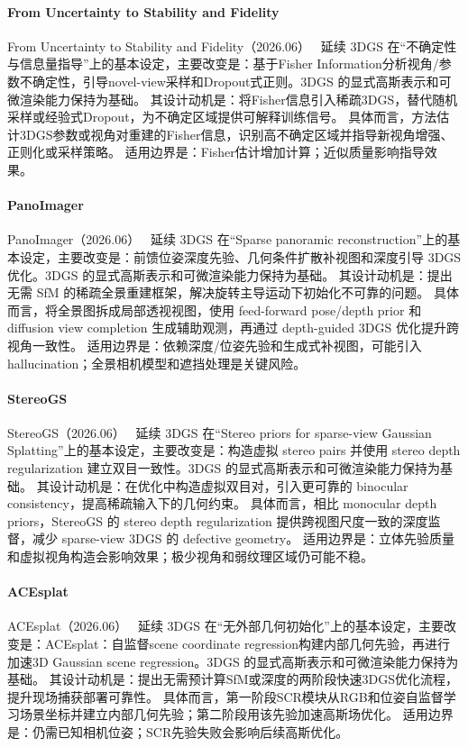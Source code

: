 \paragraph{From Uncertainty to Stability and Fidelity}
From Uncertainty to Stability and Fidelity（2026.06）~\cite{2606_20842} 延续 3DGS 在“不确定性与信息量指导”上的基本设定，主要改变是：基于Fisher Information分析视角/参数不确定性，引导novel-view采样和Dropout式正则。3DGS 的显式高斯表示和可微渲染能力保持为基础。
其设计动机是：将Fisher信息引入稀疏3DGS，替代随机采样或经验式Dropout，为不确定区域提供可解释训练信号。
具体而言，方法估计3DGS参数或视角对重建的Fisher信息，识别高不确定区域并指导新视角增强、正则化或采样策略。
适用边界是：Fisher估计增加计算；近似质量影响指导效果。

\paragraph{PanoImager}
PanoImager（2026.06）~\cite{2606_27071} 延续 3DGS 在“Sparse panoramic reconstruction”上的基本设定，主要改变是：前馈位姿深度先验、几何条件扩散补视图和深度引导 3DGS 优化。3DGS 的显式高斯表示和可微渲染能力保持为基础。
其设计动机是：提出无需 SfM 的稀疏全景重建框架，解决旋转主导运动下初始化不可靠的问题。
具体而言，将全景图拆成局部透视视图，使用 feed-forward pose/depth prior 和 diffusion view completion 生成辅助观测，再通过 depth-guided 3DGS 优化提升跨视角一致性。
适用边界是：依赖深度/位姿先验和生成式补视图，可能引入 hallucination；全景相机模型和遮挡处理是关键风险。

\paragraph{StereoGS}
StereoGS（2026.06）~\cite{2606_30545} 延续 3DGS 在“Stereo priors for sparse-view Gaussian Splatting”上的基本设定，主要改变是：构造虚拟 stereo pairs 并使用 stereo depth regularization 建立双目一致性。3DGS 的显式高斯表示和可微渲染能力保持为基础。
其设计动机是：在优化中构造虚拟双目对，引入更可靠的 binocular consistency，提高稀疏输入下的几何约束。
具体而言，相比 monocular depth priors，StereoGS 的 stereo depth regularization 提供跨视图尺度一致的深度监督，减少 sparse-view 3DGS 的 defective geometry。
适用边界是：立体先验质量和虚拟视角构造会影响效果；极少视角和弱纹理区域仍可能不稳。

\paragraph{ACEsplat}
ACEsplat（2026.06）~\cite{2606_22091} 延续 3DGS 在“无外部几何初始化”上的基本设定，主要改变是：ACEsplat：自监督scene coordinate regression构建内部几何先验，再进行加速3D Gaussian scene regression。3DGS 的显式高斯表示和可微渲染能力保持为基础。
其设计动机是：提出无需预计算SfM或深度的两阶段快速3DGS优化流程，提升现场捕获部署可靠性。
具体而言，第一阶段SCR模块从RGB和位姿自监督学习场景坐标并建立内部几何先验；第二阶段用该先验加速高斯场优化。
适用边界是：仍需已知相机位姿；SCR先验失败会影响后续高斯优化。

